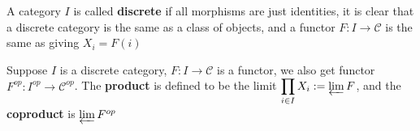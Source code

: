 \documentclass[../main.tex]{subfiles}
\begin{document}
\begin{definition}
A category $I$ is called  \textbf{discrete} if all morphisms are just identities, it is clear that a discrete category is the same as a class of objects, and a functor $F:I\to\mathscr C$ is the same as giving $X_i=F(i)$
\end{definition}

\begin{example}
Suppose $I$ is a discrete category, $F:I\to\mathscr C$ is a functor, we also get functor $F^{op}:I^{op}\to\mathscr C^{op}$. The \textbf{product} is defined to be the limit $\displaystyle\prod_{i\in I}X_i:=\varprojlim F$, and the \textbf{coproduct} is $\varprojlim F^{op}$
\end{example}
\end{document}
